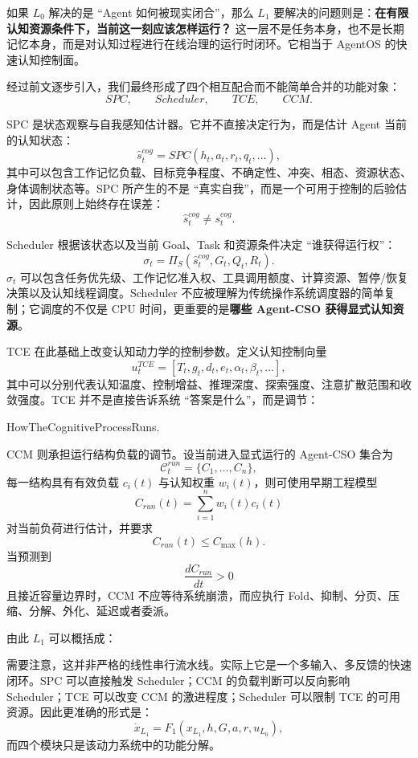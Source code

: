 如果 $L_0$ 解决的是 ``Agent 如何被现实闭合''，那么 $L_1$ 要解决的问题则是：\textbf{在有限认知资源条件下，当前这一刻应该怎样运行？} 这一层不是任务本身，也不是长期记忆本身，而是对认知过程进行在线治理的运行时闭环。它相当于 AgentOS 的快速认知控制面。

经过前文逐步引入，我们最终形成了四个相互配合而不能简单合并的功能对象：
\[
SPC,\qquad Scheduler,\qquad TCE,\qquad CCM.
\]

SPC 是状态观察与自我感知估计器。它并不直接决定行为，而是估计 Agent 当前的认知状态：
\[
\hat{s}^{cog}_t
=
SPC
\left(
h_t,
a_t,
r_t,
q_t,
\ldots
\right),
\]
其中可以包含工作记忆负载、目标竞争程度、不确定性、冲突、相态、资源状态、身体调制状态等。SPC 所产生的不是 ``真实自我''，而是一个可用于控制的后验估计，因此原则上始终存在误差：
\[
\hat{s}^{cog}_t
\neq
s^{cog}_t.
\]

Scheduler 根据该状态以及当前 Goal、Task 和资源条件决定 ``谁获得运行权''：
\[
\sigma_t
=
\Pi_S
\left(
\hat{s}^{cog}_t,
G_t,
Q_t,
R_t
\right).
\]
$\sigma_t$ 可以包含任务优先级、工作记忆准入权、工具调用额度、计算资源、暂停/恢复决策以及认知线程调度。Scheduler 不应被理解为传统操作系统调度器的简单复制；它调度的不仅是 CPU 时间，更重要的是\textbf{哪些 Agent-CSO 获得显式认知资源}。

TCE 在此基础上改变认知动力学的控制参数。定义认知控制向量
\[
u^{TCE}_t
=
\left[
T_t,
g_t,
d_t,
e_t,
\alpha_t,
\beta_t,
\ldots
\right],
\]
其中可以分别代表认知温度、控制增益、推理深度、探索强度、注意扩散范围和收敛强度。TCE 并不是直接告诉系统 ``答案是什么''，而是调节：
\begin{statementbox}
HowTheCognitiveProcessRuns.
\end{statementbox}

CCM 则承担运行结构负载的调节。设当前进入显式运行的 Agent-CSO 集合为
\[
\mathcal{C}^{run}_t
=
\{C_1,\ldots,C_n\},
\]
每一结构具有有效负载 $c_i(t)$ 与认知权重 $w_i(t)$，则可使用早期工程模型
\[
C_{run}(t)
=
\sum_{i=1}^{n}
w_i(t)c_i(t)
\]
对当前负荷进行估计，并要求
\[
C_{run}(t)
\leq
C_{\max}(h).
\]
当预测到
\[
\frac{dC_{run}}{dt}>0
\]
且接近容量边界时，CCM 不应等待系统崩溃，而应执行 Fold、抑制、分页、压缩、分解、外化、延迟或者委派。

由此 $L_1$ 可以概括成：
\begin{statementbox}
\centering
{}
\end{statementbox}

需要注意，这并非严格的线性串行流水线。实际上它是一个多输入、多反馈的快速闭环。SPC 可以直接触发 Scheduler；CCM 的负载判断可以反向影响 Scheduler；TCE 可以改变 CCM 的激进程度；Scheduler 可以限制 TCE 的可用资源。因此更准确的形式是：
\[
\dot{x}_{L_1}
=
F_1
\left(
x_{L_1},
h,
G,
a,
r,
u_{L_0}
\right),
\]
而四个模块只是该动力系统中的功能分解。

